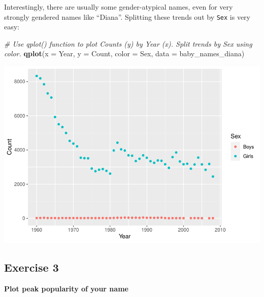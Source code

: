 \documentclass[
]{book}
\newenvironment{Shaded}{\begin{snugshade}}{\end{snugshade}}
\newcommand{\CommentTok}[1]{\textcolor[rgb]{0.56,0.35,0.01}{\textit{#1}}}
\newcommand{\DataTypeTok}[1]{\textcolor[rgb]{0.13,0.29,0.53}{#1}}
\newcommand{\KeywordTok}[1]{\textcolor[rgb]{0.13,0.29,0.53}{\textbf{#1}}}
\newcommand{\NormalTok}[1]{#1}
\begin{document}
Interestingly, there are usually some gender-atypical names, even for very strongly gendered names like ``Diana''. Splitting these trends out by \texttt{Sex} is very easy:

\begin{Shaded}
\begin{Highlighting}[]
\CommentTok{\# Use qplot() function to plot Counts (y) by Year (x). Split trends by Sex using color.}
\KeywordTok{qplot}\NormalTok{(}\DataTypeTok{x =}\NormalTok{ Year, }\DataTypeTok{y =}\NormalTok{ Count, }\DataTypeTok{color =}\NormalTok{ Sex,}
      \DataTypeTok{data =}\NormalTok{ baby\_names\_diana)}
\end{Highlighting}
\end{Shaded}

\includegraphics{R/Rintro/figures/unnamed-chunk-43-1.pdf}

\hypertarget{exercise-3}{%
\subsection{Exercise 3}\label{exercise-3}}

\textbf{Plot peak popularity of your name}
\end{document}
